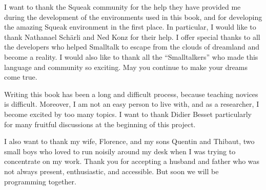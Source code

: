 \documentclass[a4paper,10pt,twoside]{book}
\begin{document}
I want to thank the Squeak community for the help they have provided me during the 
development of the environments used in this book, and for developing the amazing Squeak 
environment in the first place. In particular, I would like to thank Nathanael Sch\"arli and 
Ned Konz for their help. I offer special thanks to all the developers who helped Smalltalk to 
escape from the clouds of dreamland and become a reality. I would also like to thank all the 
“Smalltalkers” who made this language and community so exciting. May you continue to 
make your dreams come true. 


Writing this book has been a long and difficult process, because teaching novices is difficult. Moreover, I am not an easy person to live with, and as a researcher, I become excited by 
too many topics. I want to thank Didier Besset particularly for many fruitful discussions at the 
beginning of this project. 

I also want to thank my wife, Florence, and my sons Quentin and Thibaut, two small boys who loved to run noisily around my desk when I was trying to concentrate on my work. Thank you for accepting a husband and father who was not always present, enthusiastic, and accessible. But soon we will be programming together. 



\ifx\wholebook\relax\else
    
\end{document}
